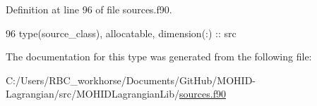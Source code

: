 Definition at line 96 of file sources.\+f90.


\begin{DoxyCode}
96         \textcolor{keywordtype}{type}(source\_class), \textcolor{keywordtype}{allocatable}, \textcolor{keywordtype}{dimension(:)} :: src
\end{DoxyCode}


The documentation for this type was generated from the following file\+:\begin{DoxyCompactItemize}
\item 
C\+:/\+Users/\+R\+B\+C\+\_\+workhorse/\+Documents/\+Git\+Hub/\+M\+O\+H\+I\+D-\/\+Lagrangian/src/\+M\+O\+H\+I\+D\+Lagrangian\+Lib/\mbox{\hyperlink{sources_8f90}{sources.\+f90}}\end{DoxyCompactItemize}
